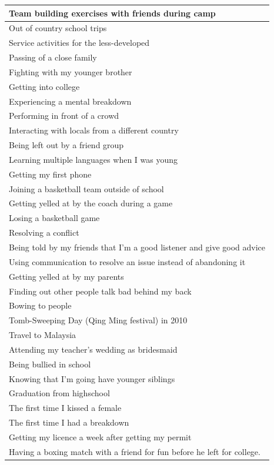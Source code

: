 \documentclass[
  .7em,
  letterpaper,
  DIV=11,
  numbers=noendperiod]{scrartcl}
\begin{document}
\begin{table}
\begin{tabular}{l}
\hline
Team building exercises with friends during camp\\
\hline
Out of country school trips\\
\hline
Service activities for the less-developed\\
\hline
Passing of a close family\\
\hline
Fighting with my younger brother\\
\hline
Getting into college\\
\hline
Experiencing a mental breakdown\\
\hline
Performing in front of a crowd\\
\hline
Interacting with locals from a different country\\
\hline
Being left out by a friend group\\
\hline
Learning multiple languages when I was young\\
\hline
Getting my first phone\\
\hline
Joining a basketball team outside of school\\
\hline
Getting yelled at by the coach during a game\\
\hline
Losing a basketball game\\
\hline
Resolving a conflict\\
\hline
Being told by my friends that I'm a good listener and give good advice\\
\hline
Using communication to resolve an issue instead of abandoning it\\
\hline
Getting yelled at by my parents\\
\hline
Finding out other people talk bad behind my back\\
\hline
Bowing to people\\
\hline
Tomb-Sweeping Day (Qing Ming festival) in 2010\\
\hline
Travel to Malaysia\\
\hline
Attending my teacher's wedding as bridesmaid\\
\hline
Being bullied in school\\
\hline
Knowing that I'm going have younger siblings\\
\hline
Graduation from highschool\\
\hline
The first time I kissed a female\\
\hline
The first time I had a breakdown\\
\hline
Getting my licence a week after getting my permit\\
\hline
Having a boxing match with a friend for fun before he left for college.\\

\end{tabular}
\end{table}
\end{document}
